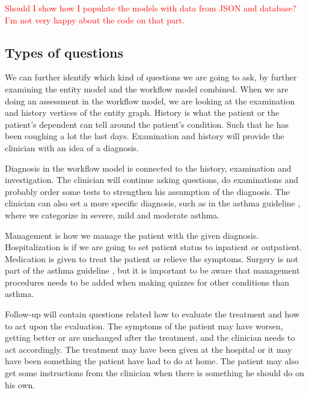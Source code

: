 \textcolor{red}{Should I show how I populate the models with data from JSON and database? I'm not very happy about the code on that part.}


\subsection{Types of questions}
We can further identify which kind of questions we are going to ask, by further examining the entity model and the workflow model combined. When we are doing an assessment in the workflow model, we are looking at the examination and history vertices of the entity graph. History is what the patient or the patient's dependent can tell around the patient's condition. Such that he has been coughing a lot the last days. Examination and history will provide the clinician with an idea of a diagnosis.

Diagnosis in the workflow model is connected to the history, examination and investigation. The clinician will continue asking questions, do examinations and probably order some tests to strengthen his assumption of the diagnosis. The clinician can also set a more specific diagnosis, such as in the asthma guideline \parencite{RepublicofKeny2016}, where we categorize in severe, mild and moderate asthma.

Management is how we manage the patient with the given diagnosis. Hospitalization is if we are going to set patient status to inpatient or outpatient. Medication is given to treat the patient or relieve the symptoms. Surgery is not part of the asthma guideline \parencite{RepublicofKeny2016}, but it is important to be aware that management procedures needs to be added when making quizzes for other conditions than asthma.

Follow-up will contain questions related how to evaluate the treatment and how to act upon the evaluation. The symptoms of the patient may have worsen, getting better or are unchanged after the treatment, and the clinician needs to act accordingly. The treatment may have been given at the hospital or it may have been something the patient have had to do at home. The patient may also get some instructions from the clinician when there is something he should do on his own.
 
